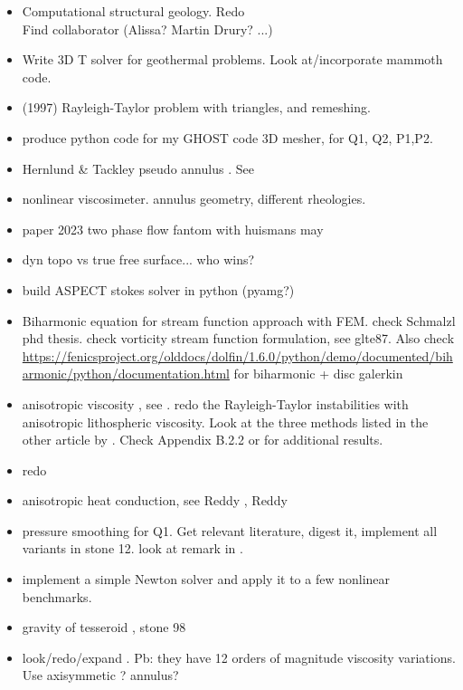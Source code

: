 \documentclass[a4paper]{article}
\begin{document}
\begin{itemize}
\item Computational structural geology. Redo  \\
Find collaborator (Alissa? Martin Drury? ...)
\item Write 3D T solver for geothermal problems. Look at/incorporate
mammoth code.
\item \textcite{vaks97} (1997) Rayleigh-Taylor problem with triangles, and remeshing.
\item produce python code for my GHOST code \textcite{thie18} 3D mesher, for Q1, Q2, P1,P2.
\item Hernlund \& Tackley pseudo annulus . See \textcite{josv21}
\item nonlinear viscosimeter. annulus geometry, different rheologies.
\item paper 2023 two phase flow fantom with huismans may
\item dyn topo vs true free surface... who wins?
\item build ASPECT stokes solver in python (pyamg?)
\item Biharmonic equation for stream function approach with FEM. check Schmalzl phd thesis.
check vorticity stream function formulation, see glte87.
Also check \url{https://fenicsproject.org/olddocs/dolfin/1.6.0/python/demo/documented/biharmonic/python/documentation.html} for biharmonic + disc galerkin
\item anisotropic viscosity , see \textcite{leha08}.
redo the Rayleigh-Taylor instabilities with 
anisotropic lithospheric viscosity.
Look at the three methods listed in the other article by \textcite{leha08b}. 
Check Appendix B.2.2 or \textcite{perr19} for additional results.

\item redo 
\item anisotropic heat conduction, see  Reddy \cite[p121]{reddybook2}, Reddy \cite[p143]{reddybook2} 
\item pressure smoothing for Q1. Get relevant literature, digest it, implement all variants in stone 12.
look at remark in \textcite{lumh24}.

\item implement a simple Newton solver and apply it to a few nonlinear  benchmarks. 

\item gravity of tesseroid , stone 98
\item look/redo/expand . Pb: they have 12 orders of magnitude viscosity variations.
Use axisymmetic ? annulus?

\end{itemize}
\end{document}
